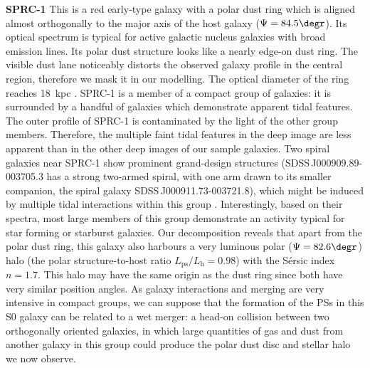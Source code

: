 \documentclass{raa}
\begin{document}
{\bf SPRC-1} 
This is a red early-type galaxy with a polar dust ring which is aligned almost orthogonally to the major axis of the host galaxy ($\Psi=84.5\degr$). Its optical spectrum is typical for active galactic nucleus galaxies with broad emission lines. Its polar dust structure looks like a nearly edge-on dust ring. The visible dust lane noticeably distorts the observed galaxy profile in the central region, therefore we mask it in our modelling. The optical diameter of the ring reaches 18~kpc \citep{2011AstL...37..171R}. SPRC-1 is a member of a compact group of galaxies: it is surrounded by a handful of galaxies which demonstrate apparent tidal features. The outer profile of SPRC-1 is contaminated by the light of the other group members. Therefore, the multiple faint tidal features in the deep image are less apparent than in the other deep images of our sample galaxies. Two spiral galaxies near SPRC-1 show prominent grand-design structures (SDSS\,J000909.89-003705.3 has a strong two-armed spiral, with one arm drawn to its smaller companion, the spiral galaxy SDSS\,J000911.73-003721.8), which might be induced by multiple tidal interactions within this group \citep[see a review by][]{2014PASA...31...35D}. Interestingly, based on their spectra, most large members of this group demonstrate an activity typical for star forming or starburst galaxies. Our decomposition reveals that apart from the polar dust ring, this galaxy also harbours a very luminous polar ($\Psi=82.6\degr$) halo (the polar structure-to-host ratio $L_\mathrm{ps}/L_\mathrm{h}=0.98$) with the S\'ersic index $n=1.7$. This halo may have the same origin as the dust ring since both have very similar position angles. As galaxy interactions and merging are very intensive in compact groups, we can suppose that the formation of the PSs in this S0 galaxy can be related to a wet merger: a head-on collision between two orthogonally oriented galaxies, in which large quantities of gas and dust from another galaxy in this group could produce the polar dust disc and stellar halo we now observe.
\end{document}
